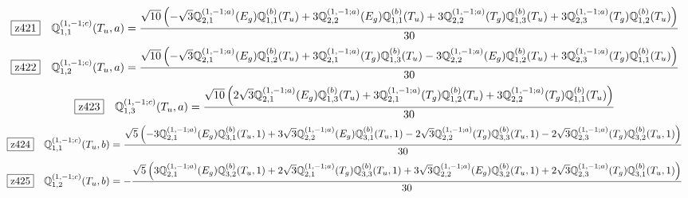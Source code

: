 \documentclass[fleqn,10pt,landscape]{jsarticle}
\begin{document}
\begin{dmath*}
\hspace*{3mm}\fbox{z421}\quad \mathbb{Q}_{1,1}^{(1,-1;c)}(T_{u},a)=\frac{\sqrt{10} \left(- \sqrt{3} \mathbb{Q}_{2,1}^{(1,-1;a)}(E_{g}) \mathbb{Q}_{1,1}^{(b)}(T_{u}) + 3 \mathbb{Q}_{2,2}^{(1,-1;a)}(E_{g}) \mathbb{Q}_{1,1}^{(b)}(T_{u}) + 3 \mathbb{Q}_{2,2}^{(1,-1;a)}(T_{g}) \mathbb{Q}_{1,3}^{(b)}(T_{u}) + 3 \mathbb{Q}_{2,3}^{(1,-1;a)}(T_{g}) \mathbb{Q}_{1,2}^{(b)}(T_{u})\right)}{30}
\end{dmath*}
\begin{dmath*}
\hspace*{3mm}\fbox{z422}\quad \mathbb{Q}_{1,2}^{(1,-1;c)}(T_{u},a)=\frac{\sqrt{10} \left(- \sqrt{3} \mathbb{Q}_{2,1}^{(1,-1;a)}(E_{g}) \mathbb{Q}_{1,2}^{(b)}(T_{u}) + 3 \mathbb{Q}_{2,1}^{(1,-1;a)}(T_{g}) \mathbb{Q}_{1,3}^{(b)}(T_{u}) - 3 \mathbb{Q}_{2,2}^{(1,-1;a)}(E_{g}) \mathbb{Q}_{1,2}^{(b)}(T_{u}) + 3 \mathbb{Q}_{2,3}^{(1,-1;a)}(T_{g}) \mathbb{Q}_{1,1}^{(b)}(T_{u})\right)}{30}
\end{dmath*}
\begin{dmath*}
\hspace*{3mm}\fbox{z423}\quad \mathbb{Q}_{1,3}^{(1,-1;c)}(T_{u},a)=\frac{\sqrt{10} \left(2 \sqrt{3} \mathbb{Q}_{2,1}^{(1,-1;a)}(E_{g}) \mathbb{Q}_{1,3}^{(b)}(T_{u}) + 3 \mathbb{Q}_{2,1}^{(1,-1;a)}(T_{g}) \mathbb{Q}_{1,2}^{(b)}(T_{u}) + 3 \mathbb{Q}_{2,2}^{(1,-1;a)}(T_{g}) \mathbb{Q}_{1,1}^{(b)}(T_{u})\right)}{30}
\end{dmath*}
\begin{dmath*}
\hspace*{3mm}\fbox{z424}\quad \mathbb{Q}_{1,1}^{(1,-1;c)}(T_{u},b)=\frac{\sqrt{5} \left(- 3 \mathbb{Q}_{2,1}^{(1,-1;a)}(E_{g}) \mathbb{Q}_{3,1}^{(b)}(T_{u},1) + 3 \sqrt{3} \mathbb{Q}_{2,2}^{(1,-1;a)}(E_{g}) \mathbb{Q}_{3,1}^{(b)}(T_{u},1) - 2 \sqrt{3} \mathbb{Q}_{2,2}^{(1,-1;a)}(T_{g}) \mathbb{Q}_{3,3}^{(b)}(T_{u},1) - 2 \sqrt{3} \mathbb{Q}_{2,3}^{(1,-1;a)}(T_{g}) \mathbb{Q}_{3,2}^{(b)}(T_{u},1)\right)}{30}
\end{dmath*}
\begin{dmath*}
\hspace*{3mm}\fbox{z425}\quad \mathbb{Q}_{1,2}^{(1,-1;c)}(T_{u},b)=- \frac{\sqrt{5} \left(3 \mathbb{Q}_{2,1}^{(1,-1;a)}(E_{g}) \mathbb{Q}_{3,2}^{(b)}(T_{u},1) + 2 \sqrt{3} \mathbb{Q}_{2,1}^{(1,-1;a)}(T_{g}) \mathbb{Q}_{3,3}^{(b)}(T_{u},1) + 3 \sqrt{3} \mathbb{Q}_{2,2}^{(1,-1;a)}(E_{g}) \mathbb{Q}_{3,2}^{(b)}(T_{u},1) + 2 \sqrt{3} \mathbb{Q}_{2,3}^{(1,-1;a)}(T_{g}) \mathbb{Q}_{3,1}^{(b)}(T_{u},1)\right)}{30}
\end{dmath*}
\end{document}
